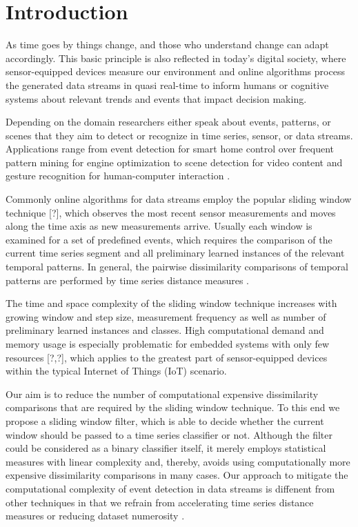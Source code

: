 \newpage
\section{Introduction} \label{introduction}

As time goes by things change, and those who understand change can adapt accordingly. This basic principle is also reflected in today's digital society, where sensor-equipped devices measure our environment and online algorithms process the generated data streams in quasi real-time to inform humans or cognitive systems about relevant trends and events that impact decision making. 

Depending on the domain researchers either speak about events, patterns, or scenes that they aim to detect or recognize in time series, sensor, or data streams. Applications range from event detection for smart home control \cite{spiegel2015metering} over frequent pattern mining for engine optimization \cite{spiegel2015driving} to scene detection for video content \cite{acar2011mediaeval} and gesture recognition for human-computer interaction \cite{liu2009uwave}.

Commonly online algorithms for data streams employ the popular sliding window technique [?], which observes the most recent sensor measurements and moves along the time axis as new measurements arrive. Usually each window is examined for a set of predefined events, which requires the comparison of the current time series segment and all preliminary learned instances of the relevant temporal patterns. In general, the pairwise dissimilarity comparisons of temporal patterns are performed by time series distance measures \cite{spiegel2015diss}.

The time and space complexity of the sliding window technique increases with growing window and step size, measurement frequency as well as number of preliminary learned instances and classes. High computational demand and memory usage is especially problematic for embedded systems with only few resources [?,?], which applies to the greatest part of sensor-equipped devices within the typical Internet of Things (IoT) scenario. 

Our aim is to reduce the number of computational expensive dissimilarity comparisons that are required by the sliding window technique. To this end we propose a sliding window filter, which is able to decide whether the current window should be passed to a time series classifier or not. Although the filter could be considered as a binary classifier itself, it merely employs statistical measures with linear complexity and, thereby, avoids using computationally more expensive dissimilarity comparisons in many cases. Our approach to mitigate the computational complexity of event detection in data streams is diffenent from other techniques in that we refrain from accelerating time series distance measures \cite{sart2010accelerating,spiegel2014lucky} or reducing dataset numerosity \cite{xi2006fast}. 


